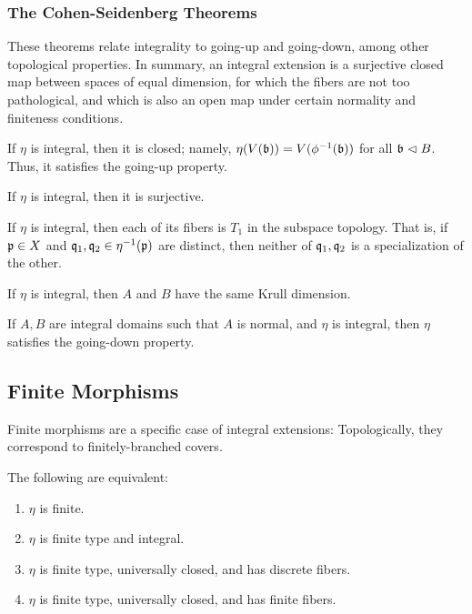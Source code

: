 \documentclass[10pt,final,oneside]{amsbook}
\numberwithin{equation}{section}
\begin{document}
\subsubsection{The Cohen-Seidenberg Theorems}

These theorems relate integrality to going-up and going-down, among other topological properties.
In summary, an integral extension is a surjective closed map between spaces of equal dimension, for which the fibers are not too pathological, and which is also an open map under certain normality and finiteness conditions.

\begin{thm}[Going Up]\label{GoingUp}
If $\eta$ is integral, then it is closed; namely, $\eta(V(\mathfrak{b})) = V(\phi^{-1}(\mathfrak{b}))$ for all $\mathfrak{b} \vartriangleleft B$.
Thus, it satisfies the going-up property.
\end{thm}

\begin{thm}\label{LyingOver}
If $\eta$ is integral, then it is surjective.
\end{thm}

\begin{thm}[Incomparability]\label{Incomparable}
If $\eta$ is integral, then each of its fibers is $T_1$ in the subspace topology.
That is, if $\mathfrak{p} \in X$ and $\mathfrak{q}_1, \mathfrak{q}_2 \in \eta^{-1}(\mathfrak{p})$ are distinct, then neither of $\mathfrak{q}_1, \mathfrak{q}_2$ is a specialization of the other.
\end{thm}

\begin{cor}
If $\eta$ is integral, then $A$ and $B$ have the same Krull dimension.
\end{cor}

\begin{thm}\label{GoingDown}
If $A, B$ are integral domains such that $A$ is normal, and $\eta$ is integral, then $\eta$ satisfies the going-down property.
\end{thm}

\subsection{Finite Morphisms}

Finite morphisms are a specific case of integral extensions:
Topologically, they correspond to finitely-branched covers.

\begin{thm}\label{Finite}
The following are equivalent:
\begin{enumerate}
\item 	$\eta$ is finite.
\item 	$\eta$ is finite type and integral.
\item 	$\eta$ is finite type, universally closed, and has discrete fibers.
\item 	$\eta$ is finite type, universally closed, and has finite fibers.
\end{enumerate}
\end{thm}
\end{document}
